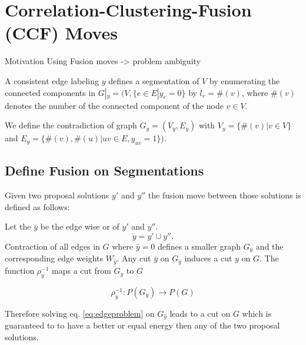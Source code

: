 \documentclass[10pt,twocolumn,letterpaper]{article}
\begin{document}
\section{Correlation-Clustering-Fusion (CCF) Moves}\label{sec:cc_fm}
Motivation Using Fusion moves -> problem ambiguity

A consistent edge labeling $y$ defines a segmentation of $V$ by enumerating the connected components 
in $G|_y=(V,\{e\in E|y_e=0\}$ by $l_v = \#(v)$, where $\#(v)$ denotes the number of the connected component of the node $v\in V$.

We define the contradiction of graph $G_y=(V_y,E_y)$
with $V_y=\{\#(v)|v\in V\}$ and $E_y=\{\#(v),\#(u)|uv\in E, y_{uv}=1\})$.

%


\subsection{Define Fusion on Segmentations}

Given two proposal solutions $y'$ and $y''$
the fusion move between those solutions is defined
as follows:

Let the $\bar{y}$ be the edge wise or of  $y'$ and $y''$.
\begin{equation}
\breve{y} =  y' \cup y''.
\end{equation}
Contraction of all edges in $G$ where $\bar{y}=0$ defines
a smaller graph $G_{\bar{y}}$ and the corresponding
edge weights $W_{\hat{y}}$.
Any cut $\bar{y}$ on $G_{\hat{y}}$ induces a cut $y$ on $G$.
The function 
$\rho_y^{-1}$ maps a cut from $G_{\hat{y}}$  to $G$ 

\begin{equation}
   \rho_y^{-1} : P(G_y) \to P(G)
\end{equation}

Therefore solving eq. \ref{eq:edgeproblem} 
on $G_{\hat{y}}$
leads to a cut on $G$ which is guaranteed to 
to have a better or equal energy
then any of the two proposal solutions.





\end{document}
